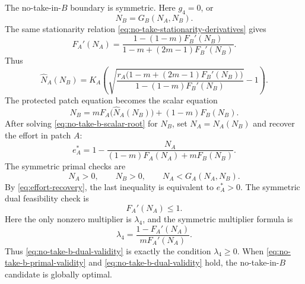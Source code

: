 \documentclass{article}
\numberwithin{equation}{section}
\begin{document}
The no-take-in-$B$ boundary is symmetric. Here $g_4=0$, or
\begin{equation}
    \label{eq:no-take-b-active-constraint}
    N_B=G_B(N_A,N_B).
\end{equation}
The same stationarity relation
\eqref{eq:no-take-stationarity-derivatives} gives
\begin{equation}
    \label{eq:no-take-b-derivative-a-from-b}
    F_A'(N_A)
    =
    \frac{1-(1-m)F_B'(N_B)}
         {1-m+(2m-1)F_B'(N_B)}.
\end{equation}
Thus
\begin{equation}
    \label{eq:no-take-b-na-from-nb}
    \widehat N_A(N_B)
    =
    K_A\left(
    \sqrt{
        \frac{
        r_A\bigl(1-m+(2m-1)F_B'(N_B)\bigr)}
        {1-(1-m)F_B'(N_B)}
    }
    -1\right).
\end{equation}
The protected patch equation becomes the scalar equation
\begin{equation}
    \label{eq:no-take-b-scalar-root}
    N_B
    =
    mF_A\bigl(\widehat N_A(N_B)\bigr)+(1-m)F_B(N_B).
\end{equation}
After solving \eqref{eq:no-take-b-scalar-root} for $N_B$, set
$N_A=\widehat N_A(N_B)$ and recover the effort in patch $A$:
\begin{equation}
    \label{eq:no-take-b-effort-recovery}
    e_A^*
    =
    1-
    \frac{N_A}
         {(1-m)F_A(N_A)+mF_B(N_B)}.
\end{equation}
The symmetric primal checks are
\begin{equation}
    \label{eq:no-take-b-primal-validity}
    N_A>0,\qquad N_B>0,\qquad N_A<G_A(N_A,N_B).
\end{equation}
By \eqref{eq:effort-recovery}, the last inequality is equivalent to
$e_A^*>0$. The symmetric dual feasibility check is
\begin{equation}
    \label{eq:no-take-b-dual-validity}
    F_A'(N_A)\leq1.
\end{equation}
Here the only nonzero multiplier is $\lambda_4$, and the symmetric
multiplier formula is
\begin{equation*}
    \lambda_4=\frac{1-F_A'(N_A)}{mF_A'(N_A)}.
\end{equation*}
Thus \eqref{eq:no-take-b-dual-validity} is exactly the condition
$\lambda_4\geq0$. When \eqref{eq:no-take-b-primal-validity} and
\eqref{eq:no-take-b-dual-validity} hold, the no-take-in-$B$
candidate is globally optimal.
\end{document}
